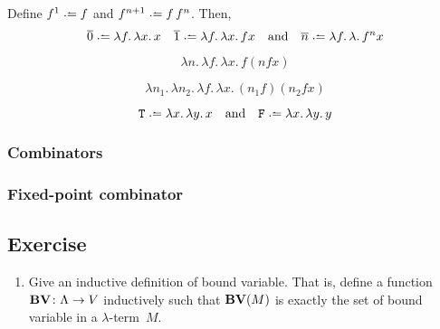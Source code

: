 \begin{definition}
  Define $f^1 \defeq f$ and $f^{n+1} \defeq f\,f^n$. Then, 
  \[
    \overline{0} \defeq \lambda f.\, \lambda x.\, x
    \quad
    \overline{1} \defeq \lambda f.\, \lambda x.\, f x
    \quad\text{and}\quad
    \overline{n} \defeq \lambda f.\, \lambda.\, f^{n} x
  \] 
\end{definition}

\begin{definition}[Successor]
  \[
    \lambda n.\, \lambda f.\, \lambda x.\, f(n f x)
  \]
\end{definition}
\begin{definition}[Addition]
  \[
    \lambda n_1.\,\lambda n_2.\, \lambda f.\,\lambda x.\, (n_1 f)(n_2 fx)
  \]
\end{definition}

\begin{definition}
  \[
    \mathtt{T} \defeq \lambda x.\,\lambda y.\, x
    \quad\text{and}\quad
    \mathtt{F} \defeq \lambda x.\,\lambda y.\, y
  \]
\end{definition}
\subsubsection{Combinators}

\subsubsection*{Fixed-point combinator}

\subsection*{Exercise}
\begin{enumerate}
  \item Give an inductive definition of bound variable. That is, define a
    function $\mathbf{BV}\colon \Lambda \to V$ inductively
    such that $\mathbf{BV}(M)$ is exactly the set of bound variable in a
    $\lambda$-term~$M$.

\end{enumerate}


 

